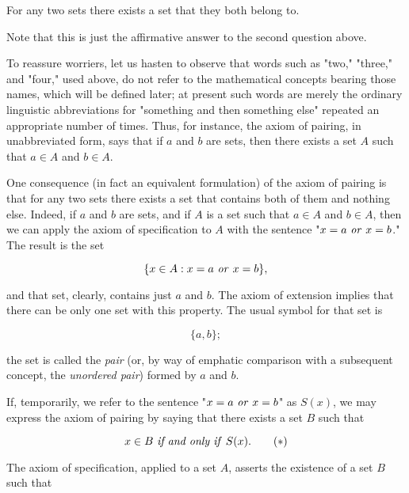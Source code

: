 \begin{named}  For any two sets there exists a set that they both belong to.
\end{named}


Note that this is just the affirmative answer to the second question above.

To reassure worriers, let us hasten to observe that words such as "two," "three," and "four," used above, do not refer to the mathematical concepts bearing those names, which will be defined later; at present such words are merely the ordinary linguistic abbreviations for "something and then something else" repeated an appropriate number of times. Thus, for instance, the axiom of pairing, in unabbreviated form, says that if $a$ and $b$ are sets, then there exists a set $A$ such that $a \in A$ and $b \in A$.

One consequence (in fact an equivalent formulation) of the axiom of pairing is that for any two sets there exists a set that contains both of them and nothing else. Indeed, if $a$ and $b$ are sets, and if $A$ is a set such that $a \in A$ and $b \in A$, then we can apply the axiom of specification to $A$ with the sentence "$x = a \text{ \textit{or} } x = b$." The result is the set 

\begin{equation*}
\{ x \in A: x = a \text{ \textit{or} } x = b \},
\end{equation*}

and that set, clearly, contains just $a$ and $b$. The axiom of extension implies that there can be only one set with this property. The usual symbol for that set is

\begin{equation*}
\{ a, b \};
\end{equation*}

the set is called the \textit{pair} (or, by way of emphatic comparison with a subsequent concept, the \textit{unordered pair}) formed by $a$ and $b$. 

If, temporarily, we refer to the sentence "$x = a \text{ \textit{or} } x = b$" as $S(x)$, we may express the axiom of pairing by saying that there exists a set $B$ such that 

\begin{equation}
\label{eq3.1}
x \in B \text{ \textit{if and only if} } S(x). \tag{$\ast$}
\end{equation}

The axiom of specification, applied to a set $A$, asserts the existence of a set $B$ such that 


